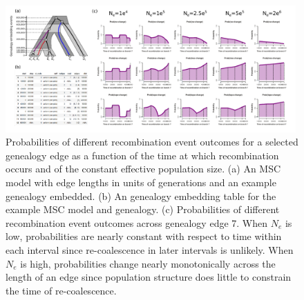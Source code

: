 \documentclass[11pt]{article}
\begin{document}
\begin{figure}[p]
	\centering
	\includegraphics[width=0.99\textwidth]{figures/Fig-S2-edge-probabilities.pdf}	
	\caption{
		Probabilities of different recombination event outcomes for a selected 
		genealogy edge as a function of the time at which recombination occurs 
		and of the constant effective population size.
		(a) An MSC model with edge lengths in units of generations and an example
		genealogy embedded. (b) An genealogy embedding table for the example MSC
		model and genealogy. (c) Probabilities of different recombination event
		outcomes across genealogy edge 7. When $N_e$ is low, probabilities are 
		nearly constant with respect to time within each interval since re-coalescence in later intervals
		is unlikely. When $N_e$ is high, probabilities change nearly monotonically 
		across the length of an edge since population structure does little
		to constrain the time of re-coalescence.
	}
     \label{fig:figS-edge-probabilities}
\end{figure}

\newpage





\end{document}
